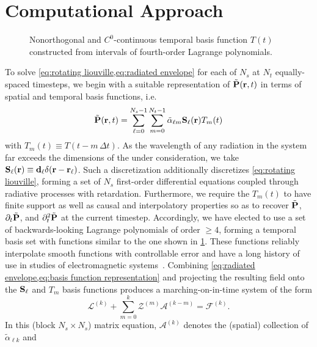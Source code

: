 \section{\label{section:computational approach}Computational Approach}

\begin{figure}
  
  \caption{\label{fig:interpolation basis} Nonorthogonal and $C^0$-continuous temporal basis function $T(t)$ constructed from intervals of fourth-order Lagrange polynomials.}
\end{figure}
To solve \cref{eq:rotating liouville,eq:radiated envelope} for each of $N_s$ \qds{} at $N_t$ equally-spaced timesteps, we begin with a suitable representation of $\tilde{\vb{P}}(\vb{r}, t)$ in terms of spatial and temporal basis functions, i.e.~
\begin{equation}
  \tilde{\vb{P}}(\vb{r}, t) = \sum_{\ell=0}^{N_s - 1} \sum_{m = 0}^{N_t - 1} \tilde{\alpha}_{\ell m} \vb{S}_\ell(\vb{r}) T_m(t)
  \label{eq:basis function representation}
\end{equation}
with $T_m(t) \equiv T(t - m \, \Delta t)$.
As the wavelength of any radiation in the system far exceeds the dimensions of the \qds{} under consideration, we take $\vb{S}_\ell(\vb{r}) \equiv \vb{d}_\ell \delta(\vb{r} - \vb{r}_\ell)$.
Such a discretization additionally discretizes \cref{eq:rotating liouville}, forming a set of $N_s$ first-order differential equations coupled through radiative processes with retardation.
Furthermore, we require the $T_m(t)$ to have finite support as well as causal and interpolatory properties so as to recover $\tilde{\vb{P}}$, $\partial_t \tilde{\vb{P}}$, and $\partial^2_t \tilde{\vb{P}}$ at the current timestep.
Accordingly, we have elected to use a set of backwards-looking Lagrange polynomials of order $\ge 4$, forming a temporal basis set with functions similar to the one shown in \cref{fig:interpolation basis}.
These functions  reliably interpolate smooth functions with controllable error and have a long history of use in studies of electromagnetic systems~\cite{SHANKER,SHANKER,SHANKER}.
Combining \cref{eq:radiated envelope,eq:basis function representation} and projecting the resulting field onto the $\vb{S}_\ell$ and $T_m$ basis functions produces a marching-on-in-time system of the form
\begin{equation}
  \mathcal{L}^{(k)} + \sum_{m = 0}^{k} \mathcal{Z}^{(m)} \mathcal{A}^{(k - m)} = \mathcal{F}^{(k)}.
  \label{eq:zmatrix}
\end{equation}
In this (block $N_s \times N_s$) matrix equation, $\mathcal{A}^{(k)}$ denotes the (spatial) collection of $\tilde{\alpha}_{\ell k}$ and
